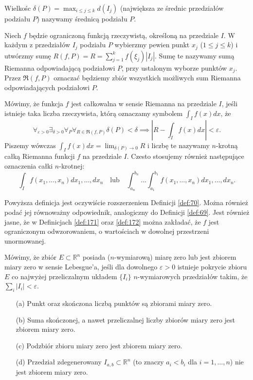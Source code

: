 \documentclass[leqno]{article}
\begin{document}
\begin{justify}
\begin{defn}
    Wielkośc $\delta(P) = \max_{i \leqslant j \leqslant k}d(I_j)$ (największa ze średnic przedziałów podziału $P$) nazywamy średnicą podziału $P$.
\end{defn}

Niech $f$ będzie ograniczoną funkcją rzeczywistą, określoną na przedziale $I$. W każdym z przedziałów $I_j$ podziału $P$ wybierzmy pewien
punkt $x_j$ ($1 \leqslant j \leqslant k$) i utwórzmy sumę $R(f, P) = R = \sum_{j=1}^{k}f(\xi_j)|I_j|$. Sumę te nazywamy sumą Riemanna odpowiadającą podziałowi $P$,
przy ustalonym wyborze punktów $x_j$. Przez $\mathfrak{R}(f, P)$ oznaczać będziemy zbiór wszystkich możliwych sum Riemanna odpowiadających podziałowi $P$.

\begin{defn}
    Mówimy, że funkcja $f$ jest całkowalna w sensie Riemanna na przedziale $I$, jeśli istnieje taka liczba rzeczywista, którą oznaczamy symbolem 
    $\int_{I} f(x)dx$, że 
    \[
        \forall_{\varepsilon > 0}\exists_{\delta > 0}\forall_{P}\forall_{R \in \mathfrak{R}(f,P)} \delta(P) < \delta \implies |R - \int_{I}f(x)dx| < \varepsilon.
    \]
    Piszemy wówczas $\int_{I}f(x)dx = \lim_{\delta(P) \to 0}R$ i liczbę te nazywamy $n$-krotną całką Riemanna funkcji $f$ na przedziale $I$.
    Czesto stosujemy również następujące oznaczenia całki $n$-krotnej:
    \[
        \int_{I}f(x_1, \ldots, x_n)dx_1, \ldots, dx_n \quad \text{lub} \quad \int_{a_n}^{b_n}\ldots \int_{a_1}^{b_1}f(x_1, \ldots, x_n)dx_1, \ldots, dx_n.
    \]
\end{defn}

Powyższa definicja jest oczywiście rozszerzeniem Definicji \ref{def:70}. Można również podać jej równoważny odpowiednik, analogiczny do Definicji \ref{def:69}.
Jest również jasne, że w Definicjach \ref{def:171} oraz \ref{def:172} można zakładać, że $f$ jest ograniczonym odwzorowaniem, o wartościach w dowolnej 
przestrzeni unormowanej.

\begin{defn}
    Mówimy, że zbiór $E \subset \mathbb{R}^n$ posiada ($n$-wymiarową) miarę zero lub jest zbiorem miary zero w sensie Lebesgue'a, jeśli
    dla dowolnego $\varepsilon > 0$ istnieje pokrycie zbioru $E$ co najwyżej przeliczalnym układem $\{I_i\}$ $n$-wymiarowych przedziałów takim, że 
    $\sum_{i}|I_i| < \varepsilon$.
\end{defn}

\begin{lemat}
{
    \begin{itemize}
        \item [(a)] Punkt oraz skończona liczbą punktów są zbiorami miary zero.
        \item [(b)] Suma skończonej, a nawet przeliczalnej liczby zbiorów miary zero jest zbiorem miary zero.
        \item [(c)] Podzbiór zbioru miary zero jest zbiorem miary zero.
        \item [(d)] Przedział zdegenerowany $I_{a,b} \subset \mathbb{R}^n$ (to znaczy $a_i < b_i$ dla $i = 1, \ldots, n$) nie jest zbiorem miary zero.
    \end{itemize}
}
\end{lemat}


\end{justify}
\end{document}
